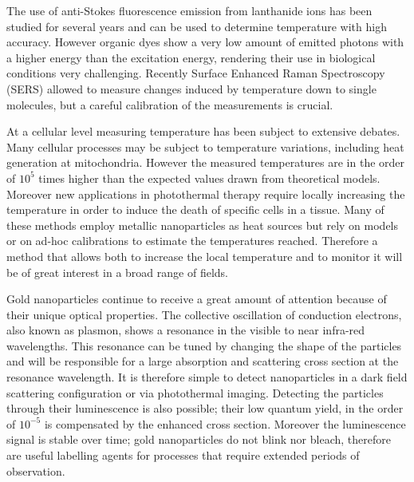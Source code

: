 The use of anti-Stokes fluorescence emission from lanthanide ions has been
studied for several years\cite{Auzel2004a} and can be used to determine
temperature with high accuracy. However organic dyes show a very low amount of
emitted photons with a higher energy than the excitation energy, rendering their
use in biological conditions very challenging. Recently Surface Enhanced Raman
Spectroscopy (SERS) allowed to measure changes induced by temperature down
to single molecules\cite{Pozzi2015}, but a careful calibration of the
measurements is crucial.

At a cellular level measuring temperature has been subject to extensive
debates\cite{Yang2011a,Suzuki2015}. Many cellular processes may be subject to
temperature variations, including heat generation at mitochondria. However the
measured temperatures\cite{Yang2011} are in the order of $10^5$ times higher
than the expected values drawn from theoretical models\cite{Sato2014}.
Moreover new applications in photothermal therapy require locally increasing the
temperature in order to induce the death of specific cells in a
tissue\cite{Huang2008,Huang2006}. Many of these methods employ metallic
nanoparticles as heat sources\cite{Gobin2007,Hirsch2003} but rely on
models\cite{Zhao2014a} or on ad-hoc calibrations to estimate the temperatures
reached\cite{Donner2013}. Therefore a method that allows both to increase the
local temperature and to monitor it will be of great interest in a broad range
of fields.

Gold nanoparticles continue to receive a great amount of attention because of
their unique optical properties\cite{Zijlstra2011}. The collective oscillation
of conduction electrons, also known as plasmon, shows a resonance in the visible to
near infra-red wavelengths. This resonance can be tuned by changing the shape of
the particles\cite{Carattino2016} and will be responsible for a large absorption
and scattering cross section at the resonance wavelength. It is therefore simple
to detect nanoparticles in a dark field scattering\cite{Hu2008} configuration or
via photothermal imaging\cite{Berciaud2006}. Detecting the particles through
their luminescence\cite{Tcherniak2011} is also possible; their low quantum
yield\cite{Fang2012,Rao2015,Yorulmaz2012,Cheng2015}, in the order of $10^{-5}$
is compensated by the enhanced cross section. Moreover the luminescence signal
is stable over time; gold nanoparticles do not blink nor bleach, therefore are 
useful labelling agents for processes that require extended periods of
observation\cite{Wang2005}.

